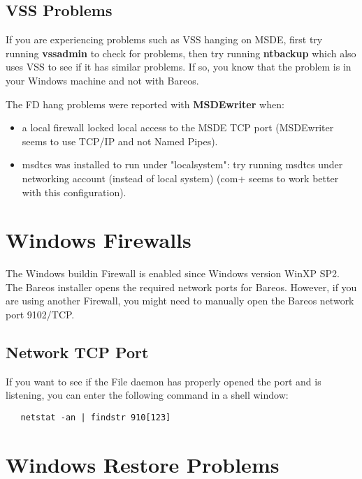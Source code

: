 \subsection{VSS Problems}


If you are experiencing problems such as VSS hanging on MSDE, first try
running {\bf vssadmin} to check for problems, then try running {\bf
ntbackup} which also uses VSS to see if it has similar problems. If so, you
know that the problem is in your Windows machine and not with Bareos.

The FD hang problems were reported with {\bf MSDEwriter} when:
\begin{itemize}
\item a local firewall locked local access to the MSDE TCP port (MSDEwriter
seems to use TCP/IP and not Named Pipes).
\item msdtcs was installed to run under "localsystem": try running msdtcs
under  networking account (instead of local system) (com+ seems to work
better with this configuration).
\end{itemize}


\section{Windows Firewalls}

The Windows buildin Firewall is enabled since Windows version WinXP SP2.
The Bareos installer opens the required network ports for Bareos.
However, if you are using another Firewall, you might need to manually open the Bareos network port 9102/TCP.

\subsection{Network TCP Port}

If you want to see if the File daemon has properly opened the port and is
listening, you can enter the following command in a shell window:

\footnotesize
\begin{verbatim}
   netstat -an | findstr 910[123]
\end{verbatim}
\normalsize


\section{Windows Restore Problems}

